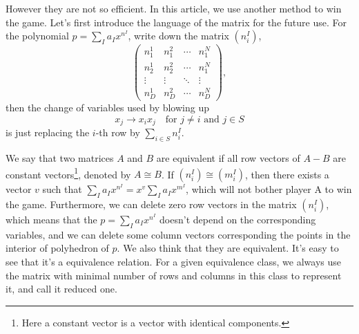 \documentclass[12pt]{article}
\theoremstyle{definition}
\theoremstyle{plain}
\begin{document}
However they are not so efficient. In this article, we use another method to win the game.
Let's first introduce the language of the matrix for the future use.
For the polynomial $p=\sum_I a_I x^{n^I}$, write down the matrix $(n^I_i)$, 
\[
\begin{pmatrix}
	n_1^1 & n_1^2 & \cdots & n_1^N\\
	n_2^1 & n_2^2 & \cdots & n_1^N\\
	\vdots & \vdots & \ddots & \vdots\\
	n_D^1 & n_D^2 & \cdots & n_D^N
\end{pmatrix},
\]
then the change of variables used by blowing up  
\[
	x_j\to x_ix_j \quad \text{for $j\neq i$ and $j\in S$}
\] 
is just replacing the $i$-th row by $\sum_{i\in S} n_i^I$.

We say that two matrices $A$ and $B$ are equivalent if all row vectors of $A-B$ are constant 
vectors\footnote{Here a constant vector is a vector with identical components.},
denoted by $A\cong B$. If $(n^I_i)\cong (m^I_i)$, then there exists a vector $v$ such that
$\sum_I a_I x^{n^I}=x^v\sum_I a_I x^{m^I}$, which will not bother player A to win the game.
Furthermore, we can delete zero row vectors in the matrix $(n^I_i)$, which means that the
$p=\sum_I a_I x^{n^I}$ doesn't depend on the corresponding variables, and 
we can delete some column vectors corresponding the points in the interior of polyhedron of $p$.
We also think that they are equivalent. It's easy to see that it's a equivalence relation.
For a given equivalence class, we always use the matrix with minimal number of rows and columns 
in this class to represent it, and call it reduced one.
\end{document}

